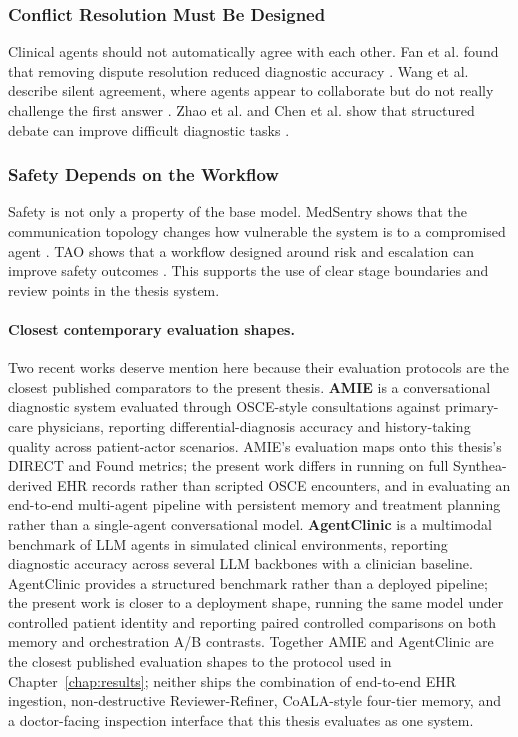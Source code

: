 \subsubsection*{Conflict Resolution Must Be Designed}

Clinical agents should not automatically agree with each other. Fan et al. found
that removing dispute resolution reduced diagnostic accuracy
\cite{Fan2024AIHospital}. Wang et al. describe silent agreement, where agents
appear to collaborate but do not really challenge the first answer
\cite{Wang2025Catfish}. Zhao et al. and Chen et al. show that structured debate
can improve difficult diagnostic tasks
\cite{Zhao2025LayeredDebate,Chen2025MDTeamGPT}.

\subsubsection*{Safety Depends on the Workflow}

Safety is not only a property of the base model. MedSentry shows that the
communication topology changes how vulnerable the system is to a compromised
agent \cite{Chen2025MedSentry}. TAO shows that a workflow designed around risk
and escalation can improve safety outcomes \cite{Kim2025TAO}. This supports the
use of clear stage boundaries and review points in the thesis system.

\paragraph{Closest contemporary evaluation shapes.}
Two recent works deserve mention here because their evaluation
protocols are the closest published comparators to the present thesis.
\textbf{AMIE} \cite{Tu2024AMIE} is a conversational diagnostic system
evaluated through OSCE-style consultations against primary-care
physicians, reporting differential-diagnosis accuracy and history-taking
quality across patient-actor scenarios. AMIE's evaluation maps onto
this thesis's DIRECT and Found metrics; the present work differs in
running on full Synthea-derived EHR records rather than scripted
OSCE encounters, and in evaluating an end-to-end multi-agent pipeline
with persistent memory and treatment planning rather than a
single-agent conversational model. \textbf{AgentClinic}
\cite{Schmidgall2024AgentClinic} is a multimodal benchmark of LLM
agents in simulated clinical environments, reporting diagnostic
accuracy across several LLM backbones with a clinician baseline.
AgentClinic provides a structured benchmark rather than a deployed
pipeline; the present work is closer to a deployment shape, running
the same model under controlled patient identity and reporting paired
controlled comparisons on both memory and orchestration A/B contrasts.
Together AMIE and AgentClinic are the closest published evaluation
shapes to the protocol used in Chapter~\ref{chap:results}; neither
ships the combination of end-to-end EHR ingestion, non-destructive
Reviewer-Refiner, CoALA-style four-tier memory, and a doctor-facing
inspection interface that this thesis evaluates as one system.

